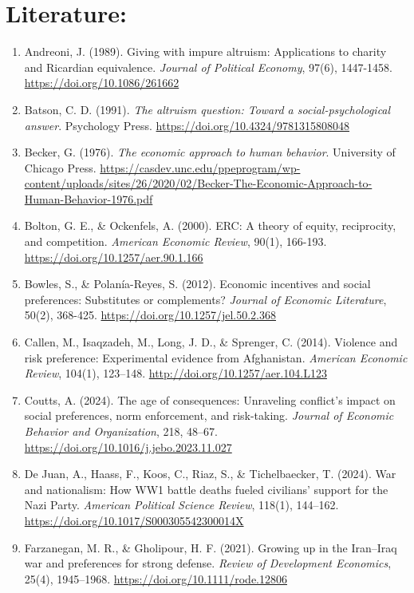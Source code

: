 \documentclass[14pt]{article}
\theoremstyle{remark}
\begin{document}
\section{Literature:}

\begin{enumerate}
    \item Andreoni, J. (1989). Giving with impure altruism: Applications to charity and Ricardian equivalence. \textit{Journal of Political Economy}, 97(6), 1447-1458. \url{https://doi.org/10.1086/261662}
    \item Batson, C. D. (1991). \textit{The altruism question: Toward a social-psychological answer}. Psychology Press. \url{https://doi.org/10.4324/9781315808048}
    \item Becker, G. (1976). \textit{The economic approach to human behavior}. University of Chicago Press. \url{https://casdev.unc.edu/ppeprogram/wp-content/uploads/sites/26/2020/02/Becker-The-Economic-Approach-to-Human-Behavior-1976.pdf}
    \item Bolton, G. E., \& Ockenfels, A. (2000). ERC: A theory of equity, reciprocity, and competition. \textit{American Economic Review}, 90(1), 166-193. \url{https://doi.org/10.1257/aer.90.1.166}
    \item Bowles, S., \& Polanía-Reyes, S. (2012). Economic incentives and social preferences: Substitutes or complements? \textit{Journal of Economic Literature}, 50(2), 368-425. \url{https://doi.org/10.1257/jel.50.2.368}
    \item Callen, M., Isaqzadeh, M., Long, J. D., \& Sprenger, C. (2014). Violence and risk preference: Experimental evidence from Afghanistan. \textit{American Economic Review}, 104(1), 123--148. \url{http://doi.org/10.1257/aer.104.L123}
    \item Coutts, A. (2024). The age of consequences: Unraveling conflict's impact on social preferences, norm enforcement, and risk-taking. \textit{Journal of Economic Behavior and Organization}, 218, 48--67. \url{https://doi.org/10.1016/j.jebo.2023.11.027}
    \item De Juan, A., Haass, F., Koos, C., Riaz, S., \& Tichelbaecker, T. (2024). War and nationalism: How WW1 battle deaths fueled civilians' support for the Nazi Party. \textit{American Political Science Review}, 118(1), 144--162. \url{https://doi.org/10.1017/S000305542300014X}
    \item Farzanegan, M. R., \& Gholipour, H. F. (2021). Growing up in the Iran--Iraq war and preferences for strong defense. \textit{Review of Development Economics}, 25(4), 1945--1968. \url{https://doi.org/10.1111/rode.12806}

\end{enumerate}
\end{document}
